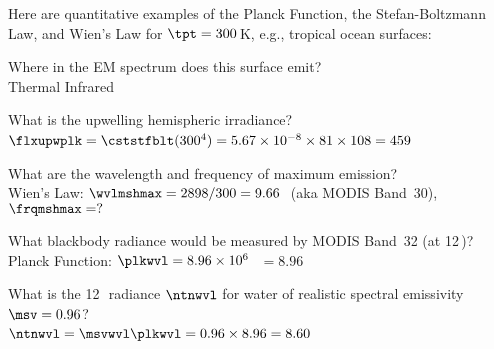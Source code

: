 \documentclass[12pt]{article}
\begin{document}
Here are quantitative examples of the Planck Function, the Stefan-Boltzmann Law, and Wien's Law for $\tpt = 300$\,K, e.g., tropical ocean surfaces:
\begin{enumerate*}
\item Where in the EM spectrum does this surface emit?\\
Thermal Infrared
\item What is the upwelling hemispheric irradiance?\\
$\flxupwplk = \cststfblt (300^{4}) = 5.67 \times 10^{-8} \times 81 \times 108 = 459$\,\wxmS
\item What are the wavelength and frequency of maximum emission?\\
Wien's Law: $\wvlmshmax= 2898/300 = 9.66$\,\um\ (aka MODIS Band~30), $\frqmshmax = ?$
\item What blackbody radiance would be measured by MODIS Band~32  (at 12\,\um)?\\
Planck Function: $\plkwvl = 8.96 \times 10^{6}$\,\wxmSsrm\ $ = 8.96$\,\wxmSsrum
\item What is the 12\,\um\ radiance $\ntnwvl$ for water of realistic spectral emissivity $\msv = 0.96$?\\
$\ntnwvl = \msvwvl \plkwvl = 0.96 \times 8.96 = 8.60$\,\wxmSsrum
\end{enumerate*}
\clearpage
\end{document}
